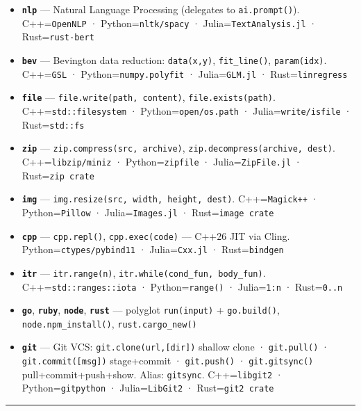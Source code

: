 \documentclass[
]{article}
\providecommand{\tightlist}{%
  \setlength{\itemsep}{0pt}\setlength{\parskip}{0pt}}
\begin{document}
\begin{itemize}
\tightlist
\item
  \textbf{\texttt{nlp}} --- Natural Language Processing (delegates to
  \texttt{ai.prompt()}). C++=\texttt{OpenNLP} ·
  Python=\texttt{nltk/spacy} · Julia=\texttt{TextAnalysis.jl} ·
  Rust=\texttt{rust-bert}
\item
  \textbf{\texttt{bev}} --- Bevington data reduction:
  \texttt{data(x,y)}, \texttt{fit\_line()}, \texttt{param(idx)}.
  C++=\texttt{GSL} · Python=\texttt{numpy.polyfit} ·
  Julia=\texttt{GLM.jl} · Rust=\texttt{linregress}
\item
  \textbf{\texttt{file}} --- \texttt{file.write(path,\ content)},
  \texttt{file.exists(path)}. C++=\texttt{std::filesystem} ·
  Python=\texttt{open/os.path} · Julia=\texttt{write/isfile} ·
  Rust=\texttt{std::fs}
\item
  \textbf{\texttt{zip}} --- \texttt{zip.compress(src,\ archive)},
  \texttt{zip.decompress(archive,\ dest)}. C++=\texttt{libzip/miniz} ·
  Python=\texttt{zipfile} · Julia=\texttt{ZipFile.jl} ·
  Rust=\texttt{zip\ crate}
\item
  \textbf{\texttt{img}} ---
  \texttt{img.resize(src,\ width,\ height,\ dest)}.
  C++=\texttt{Magick++} · Python=\texttt{Pillow} ·
  Julia=\texttt{Images.jl} · Rust=\texttt{image\ crate}
\item
  \textbf{\texttt{cpp}} --- \texttt{cpp.repl()}, \texttt{cpp.exec(code)}
  --- C++26 JIT via Cling. Python=\texttt{ctypes/pybind11} ·
  Julia=\texttt{Cxx.jl} · Rust=\texttt{bindgen}
\item
  \textbf{\texttt{itr}} --- \texttt{itr.range(n)},
  \texttt{itr.while(cond\_fun,\ body\_fun)}.
  C++=\texttt{std::ranges::iota} · Python=\texttt{range()} ·
  Julia=\texttt{1:n} · Rust=\texttt{0..n}
\item
  \textbf{\texttt{go}}, \textbf{\texttt{ruby}}, \textbf{\texttt{node}},
  \textbf{\texttt{rust}} --- polyglot \texttt{run(input)} +
  \texttt{go.build()}, \texttt{node.npm\_install()},
  \texttt{rust.cargo\_new()}
\item
  \textbf{\texttt{git}} --- Git VCS: \texttt{git.clone(url,{[}dir{]})}
  shallow clone · \texttt{git.pull()} · \texttt{git.commit({[}msg{]})}
  stage+commit · \texttt{git.push()} · \texttt{git.gitsync()}
  pull+commit+push+show. Alias: \texttt{gitsync}. C++=\texttt{libgit2} ·
  Python=\texttt{gitpython} · Julia=\texttt{LibGit2} ·
  Rust=\texttt{git2\ crate}
\end{itemize}

\begin{center}\rule{0.5\linewidth}{0.5pt}\end{center}
\end{document}
